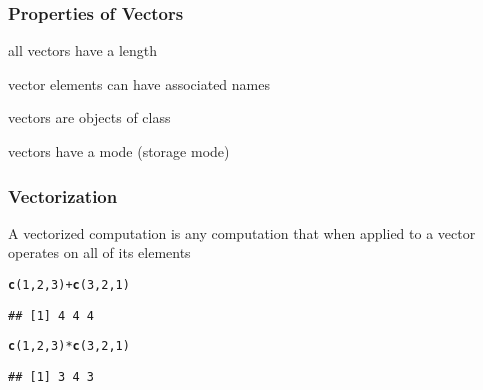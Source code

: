 \documentclass[12pt]{beamer}\usepackage[]{graphicx}\usepackage[]{color}
\makeatletter
\newcommand{\hlnum}[1]{\textcolor[rgb]{0.686,0.059,0.569}{#1}}%
\newcommand{\hlopt}[1]{\textcolor[rgb]{0,0,0}{#1}}%
\newcommand{\hlstd}[1]{\textcolor[rgb]{0.345,0.345,0.345}{#1}}%
\newcommand{\hlkwd}[1]{\textcolor[rgb]{0.737,0.353,0.396}{\textbf{#1}}}%
\newenvironment{kframe}{%
 \def\at@end@of@kframe{}%
 \ifinner\ifhmode%
  \def\at@end@of@kframe{\end{minipage}}%
  \begin{minipage}{\columnwidth}%
 \fi\fi%
 \def\FrameCommand##1{\hskip\@totalleftmargin \hskip-\fboxsep
 \colorbox{shadecolor}{##1}\hskip-\fboxsep
     \hskip-\linewidth \hskip-\@totalleftmargin \hskip\columnwidth}%
 \MakeFramed {\advance\hsize-\width
   \@totalleftmargin\z@ \linewidth\hsize
   \@setminipage}}%
 {\par\unskip\endMakeFramed%
 \at@end@of@kframe}
\newenvironment{knitrout}{}{} %
\makeatother
\begin{document}

\begin{frame}
\frametitle{Properties of Vectors}

\bbi
  \item all vectors have a length
  \item vector elements can have associated names
  \item vectors are objects of class 
  \item vectors have a mode (storage mode)
\ei

\end{frame}


\begin{frame}[fragile]
\frametitle{Vectorization}

A vectorized computation is any computation that when applied to a 
vector operates on all of its elements

\begin{knitrout}\footnotesize
{}\color{fgcolor}\begin{kframe}
\begin{alltt}
\hlkwd{c}\hlstd{(}\hlnum{1}\hlstd{,} \hlnum{2}\hlstd{,} \hlnum{3}\hlstd{)} \hlopt{+} \hlkwd{c}\hlstd{(}\hlnum{3}\hlstd{,} \hlnum{2}\hlstd{,} \hlnum{1}\hlstd{)}
\end{alltt}
\begin{verbatim}
## [1] 4 4 4
\end{verbatim}
\begin{alltt}
\hlkwd{c}\hlstd{(}\hlnum{1}\hlstd{,} \hlnum{2}\hlstd{,} \hlnum{3}\hlstd{)} \hlopt{*} \hlkwd{c}\hlstd{(}\hlnum{3}\hlstd{,} \hlnum{2}\hlstd{,} \hlnum{1}\hlstd{)}
\end{alltt}
\begin{verbatim}
## [1] 3 4 3
\end{verbatim}
\end{kframe}
\end{knitrout}

\end{frame}

\end{document}
